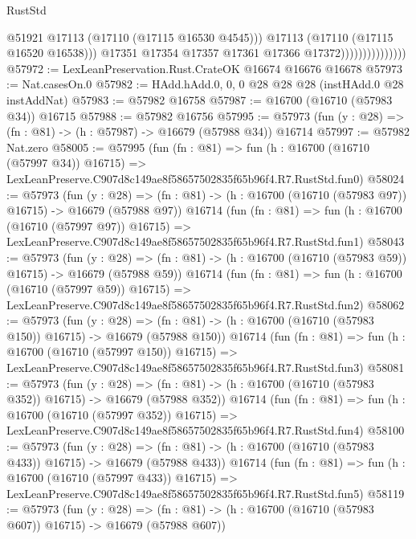 \begin{lexlean}{RustStd}
\begin{coremodule}
                                      @51921
                                      @17113
                                      (@17110 (@17115 @16530 @4545)))
                                    @17113
                                    (@17110 (@17115 @16520 @16538)))
                                  @17351
                                  @17354
                                  @17357
                                  @17361
                                  @17366
                                  @17372)))))))))))))))
@57972 := LexLeanPreservation.Rust.CrateOK @16674 @16676 @16678
@57973 := Nat.casesOn.{0}
@57982 := HAdd.hAdd.{0, 0, 0} @28 @28 @28 (instHAdd.{0} @28 instAddNat)
@57983 := @57982 @16758
@57987 := @16700 (@16710 (@57983 @34)) @16715
@57988 := @57982 @16756
@57995 := @57973 (fun (y : @28) => (fn : @81) -> (h : @57987) -> @16679 (@57988 @34)) @16714
@57997 := @57982 Nat.zero
@58005 := @57995
    (fun (fn : @81) =>
    fun (h : @16700 (@16710 (@57997 @34)) @16715) =>
    LexLeanPreserve.C907d8c149ae8f58657502835f65b96f4.R7.RustStd.fun0)
@58024 := @57973
    (fun (y : @28) =>
    (fn : @81) -> (h : @16700 (@16710 (@57983 @97)) @16715) -> @16679 (@57988 @97))
    @16714
    (fun (fn : @81) =>
    fun (h : @16700 (@16710 (@57997 @97)) @16715) =>
    LexLeanPreserve.C907d8c149ae8f58657502835f65b96f4.R7.RustStd.fun1)
@58043 := @57973
    (fun (y : @28) =>
    (fn : @81) -> (h : @16700 (@16710 (@57983 @59)) @16715) -> @16679 (@57988 @59))
    @16714
    (fun (fn : @81) =>
    fun (h : @16700 (@16710 (@57997 @59)) @16715) =>
    LexLeanPreserve.C907d8c149ae8f58657502835f65b96f4.R7.RustStd.fun2)
@58062 := @57973
    (fun (y : @28) =>
    (fn : @81) -> (h : @16700 (@16710 (@57983 @150)) @16715) -> @16679 (@57988 @150))
    @16714
    (fun (fn : @81) =>
    fun (h : @16700 (@16710 (@57997 @150)) @16715) =>
    LexLeanPreserve.C907d8c149ae8f58657502835f65b96f4.R7.RustStd.fun3)
@58081 := @57973
    (fun (y : @28) =>
    (fn : @81) -> (h : @16700 (@16710 (@57983 @352)) @16715) -> @16679 (@57988 @352))
    @16714
    (fun (fn : @81) =>
    fun (h : @16700 (@16710 (@57997 @352)) @16715) =>
    LexLeanPreserve.C907d8c149ae8f58657502835f65b96f4.R7.RustStd.fun4)
@58100 := @57973
    (fun (y : @28) =>
    (fn : @81) -> (h : @16700 (@16710 (@57983 @433)) @16715) -> @16679 (@57988 @433))
    @16714
    (fun (fn : @81) =>
    fun (h : @16700 (@16710 (@57997 @433)) @16715) =>
    LexLeanPreserve.C907d8c149ae8f58657502835f65b96f4.R7.RustStd.fun5)
@58119 := @57973
    (fun (y : @28) =>
    (fn : @81) -> (h : @16700 (@16710 (@57983 @607)) @16715) -> @16679 (@57988 @607))

\end{coremodule}
\end{lexlean}
